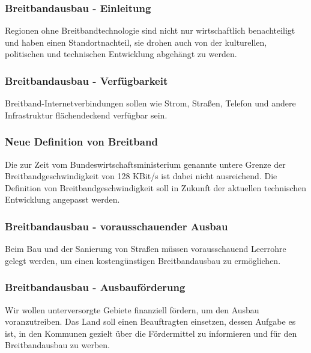 \label{wp:monopol:inet2}

\subsubsection{Breitbandausbau - Einleitung}
\abstimmung
Regionen ohne Breitbandtechnologie sind nicht nur wirtschaftlich benachteiligt und haben einen Standortnachteil, sie drohen auch von der kulturellen, politischen und technischen Entwicklung abgehängt zu werden.

\subsubsection{Breitbandausbau - Verfügbarkeit}
\abstimmung
Breitband-Internetverbindungen sollen wie Strom, Straßen, Telefon und andere Infrastruktur flächendeckend verfügbar sein.

\subsubsection{Neue Definition von Breitband}
\abstimmung
Die zur Zeit vom Bundeswirtschaftsministerium genannte untere Grenze der Breitbandgeschwindigkeit von 128 KBit/s ist dabei nicht ausreichend. Die Definition von Breitbandgeschwindigkeit soll in Zukunft der aktuellen technischen Entwicklung angepasst werden.

\subsubsection{Breitbandausbau - vorausschauender Ausbau}
\abstimmung
Beim Bau und der Sanierung von Straßen müssen vorausschauend Leerrohre gelegt werden, um einen kostengünstigen Breitbandausbau zu ermöglichen.
\subsubsection{Breitbandausbau - Ausbauförderung}
\abstimmung
Wir wollen unterversorgte Gebiete finanziell fördern, um den Ausbau voranzutreiben. Das Land soll einen Beauftragten einsetzen, dessen Aufgabe es ist, in den Kommunen gezielt über die Fördermittel zu informieren und für den Breitbandausbau zu werben.